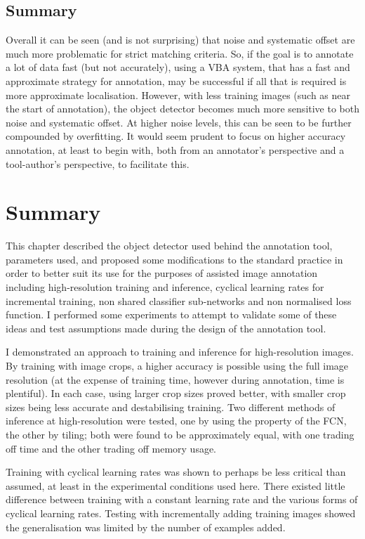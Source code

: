 \subsection{Summary}

Overall it can be seen (and is not surprising) that noise and systematic offset are much more problematic for strict matching criteria. So, if the goal is to annotate a lot of data fast (but not accurately), using a \gls{VBA} system, that has a fast and approximate strategy for annotation, may be successful if all that is required is more approximate localisation. However, with less training images (such as near the start of annotation), the object detector becomes much more sensitive to both noise and systematic offset. At higher noise levels, this can be seen to be further compounded by overfitting. It would seem prudent to focus on higher accuracy annotation, at least to begin with, both from an annotator's perspective and a tool-author's perspective, to facilitate this.

\section {Summary}

This chapter described the object detector used behind the annotation tool, parameters used, and proposed some modifications to the standard practice in order to better suit its use for the purposes of assisted image annotation including high-resolution training and inference, cyclical learning rates for incremental training, non shared classifier sub-networks and non normalised loss function. I performed some experiments to attempt to validate some of these ideas and test assumptions made during the design of the annotation tool.

I demonstrated an approach to training and inference for high-resolution images. By training with image crops, a higher accuracy is possible using the full image resolution (at the expense of training time, however during annotation, time is plentiful). In each case, using larger crop sizes proved better, with smaller crop sizes being less accurate and destabilising training. Two different methods of inference at high-resolution were tested, one by using the property of the \gls{FCN}, the other by tiling; both were found to be approximately equal, with one trading off time and the other trading off memory usage.

Training with cyclical learning rates was shown to perhaps be less critical than assumed, at least in the experimental conditions used here. There existed little difference between training with a constant learning rate and the various forms of cyclical learning rates. Testing with incrementally adding training images showed the generalisation was limited by the number of examples added.

